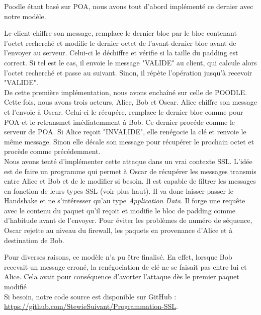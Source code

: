 Poodle étant basé sur POA, nous avons tout  d'abord implémenté ce dernier avec notre modèle.

 Le client chiffre son
message, remplace le dernier bloc par le bloc contenant l'octet recherché et modifie le dernier octet de l'avant-dernier bloc avant de l'envoyer au serveur. Celui-ci le déchiffre et vérifie si la taille du padding est correct. Si
tel est le cas, il envoie le message "VALIDE" au client, qui calcule alors l'octet recherché et passe au suivant.
Sinon, il répète l'opération jusqu'à recevoir "VALIDE".\\

De cette première implémentation, nous avons enchaîné sur celle de POODLE. Cette fois, nous avons trois acteurs,
Alice, Bob et Oscar. Alice chiffre son message et l'envoie à Oscar. Celui-ci le récupére, remplace le dernier bloc
comme pour POA et le retransmet imédiatemment à Bob. Ce dernier procéde comme le serveur de POA. Si Alice reçoit
"INVALIDE", elle renégocie la clé et renvoie le même message. Sinon elle décale son message pour récupérer le 
prochain octet et procède comme précédemment.\\

Nous avons tenté d'implémenter cette attaque dans un vrai contexte SSL. L'idée est de faire un programme qui permet à
Oscar de récupérer les messages transmis entre Alice et Bob et de le modifier si besoin. Il est capable de filtrer
les messages en fonction de leurs types SSL (voir plus haut). Il va donc laisser passer le Handshake et ne s'intéresser qu'au type \emph{Application Data}. Il forge une requête avec le contenu du paquet qu'il reçoit et modifie le
bloc de padding comme d'habitude avant de l'envoyer. Pour éviter les problèmes de numéro de séquence, Oscar rejette 
au niveau du firewall, les paquets en provenance d'Alice et à destination de Bob.

Pour diverses raisons, ce modèle n'a pu être finalisé. En effet, lorsque Bob recevait un message erroné,
la renégociation de clé ne se faisait pas entre lui et Alice. Cela avait pour conséquence d'avorter l'attaque
dès le premier paquet modifié\\

Si besoin, notre code source est disponible sur GitHub : \url{https://github.com/StewieSuivant/Programmation-SSL}.
